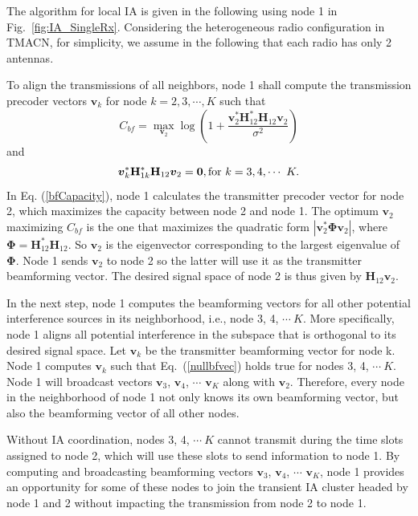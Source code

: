 \documentclass[letterpaper,11pt]{article}
\begin{document}
The algorithm for local IA is given in the following using node 1 in Fig.~\ref{fig:IA_SingleRx}. Considering the heterogeneous radio configuration in TMACN, for simplicity, we assume in the following that each radio has only 2 antennas.  
 
To align the transmissions of all neighbors, node 1 shall compute the transmission precoder vectors ${\boldsymbol{v}}_k$ for node $k=2, 3, \cdots, K$ such that
\begin{equation}\label{bfCapacity}
C_{bf}=\displaystyle\max_{{\boldsymbol{v}}_2}\log\left(1+\frac{\boldsymbol{v}_2^{*}\mathbf{H}_{12}^{*}\mathbf{H}_{12}\boldsymbol{v}_2}{\sigma^2}\right)
\end{equation}
and
\begin{equation}\label{nullbfvec}
\boldsymbol{v}_k^{*}\mathbf{H}_{1k}^{*}\mathbf{H}_{12}\boldsymbol{v}_2=\mathbf{0}, {\rm{for}}~k=3,4,\cdots~K.
\end{equation}
In Eq. (\ref{bfCapacity}), node 1 calculates the transmitter precoder vector for node 2, which maximizes the capacity between node 2 and node 1. The optimum $\boldsymbol{v}_2$ maximizing $C_{bf}$ is the one that maximizes the quadratic form $|\boldsymbol{v}_2^*\boldsymbol{\Phi}\boldsymbol{v}_2|$, where $\boldsymbol{\Phi}=\mathbf{H}_{12}^{*}\mathbf{H}_{12}$. So $\boldsymbol{v}_2$ is the eigenvector corresponding to the largest eigenvalue of $\boldsymbol{\Phi}$. Node 1 sends $\boldsymbol{v}_2$ to node 2 so the latter will use it as the transmitter beamforming vector. The desired signal space of node 2 is thus given by $\mathbf{H}_{12}\boldsymbol{v}_2$. 

In the next step, node 1 computes the beamforming vectors for all other potential interference sources in its neighborhood, i.e., node 3, 4, $\cdots~K$. More specifically, node 1 aligns all potential interference in the subspace that is orthogonal to its desired signal space. Let $\boldsymbol{v}_k$ be the transmitter beamforming vector for node k. Node 1 computes $\boldsymbol{v}_k$ such that Eq.~(\ref{nullbfvec}) holds true for nodes 3, 4, $\cdots~K$. Node 1 will broadcast vectors $\boldsymbol{v}_3$, $\boldsymbol{v}_4$, $\cdots$ $\boldsymbol{v}_K$ along with $\boldsymbol{v}_2$. Therefore, every node in the neighborhood of node 1 not only knows its own beamforming vector, but also the beamforming vector of all other nodes.

Without IA coordination, nodes 3, 4, $\cdots~K$ cannot transmit during the time slots assigned to node 2, which will use these slots to send information to node 1. By computing and broadcasting beamforming vectors $\boldsymbol{v}_3$, $\boldsymbol{v}_4$, $\cdots$ $\boldsymbol{v}_K$, node 1 provides an opportunity for some of these nodes to join the transient IA cluster headed by node 1 and 2 without impacting the transmission from node 2 to node 1. 
\end{document}
